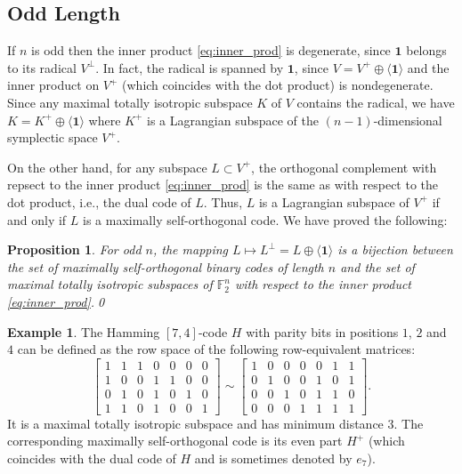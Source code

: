 \documentclass[a4paper,reqno]{amsart}
\newcommand{\buno}{\mathbf{1}}
\newcommand{\bzero}{\mathbf{0}}
\newcommand{\FF}{\mathbb{F}}
\newtheorem{proposition}[theorem]{Proposition}
\theoremstyle{definition}
\newtheorem{example}[theorem]{Example}
\theoremstyle{remark} \newtheorem{remark}[theorem]{Remark}
\numberwithin{equation}{section}
\begin{document}
\subsection{Odd Length}

If $n$ is odd then the inner product \eqref{eq:inner_prod} is degenerate, since $\buno$ belongs to its radical $V^\perp$. In fact, the radical is spanned by $\buno$, since $V=V^+\oplus\langle\buno\rangle$ and the inner product on $V^+$ (which coincides with the dot product) is nondegenerate. Since any maximal totally isotropic subspace $K$ of $V$ contains the radical, we have $K=K^+\oplus\langle\buno\rangle$ where $K^+$ is a Lagrangian subspace of the $(n-1)$-dimensional symplectic space $V^+$. 

On the other hand, for any subspace $L\subset V^+$, the orthogonal complement with repsect to the inner product \eqref{eq:inner_prod} is the same as with respect to the dot product, i.e., the dual code of $L$. Thus, $L$ is a Lagrangian subspace of $V^+$ if and only if $L$ is a maximally self-orthogonal code. We have proved the following:

\begin{proposition}\label{prop:odd_n}
    For odd $n$, the mapping $L\mapsto L^\perp=L\oplus\langle\buno\rangle$ is a bijection between the set of maximally self-orthogonal binary codes of length $n$ and the set of maximal totally isotropic subspaces of $\FF_2^n$ with respect to the inner product \eqref{eq:inner_prod}.\qed 
\end{proposition}

\begin{example}\label{ex:Hamming}
The Hamming $[7,4]$-code $H$ with parity bits in positions $1$, $2$ and $4$ can be defined as the row space of the following row-equivalent matrices:
\[
\begin{bmatrix}
1 & 1 & 1 & 0 & 0 & 0 & 0\\
1 & 0 & 0 & 1 & 1 & 0 & 0\\
0 & 1 & 0 & 1 & 0 & 1 & 0\\
1 & 1 & 0 & 1 & 0 & 0 & 1
\end{bmatrix}\sim
\begin{bmatrix}
1 & 0 & 0 & 0 & 0 & 1 & 1\\
0 & 1 & 0 & 0 & 1 & 0 & 1\\
0 & 0 & 1 & 0 & 1 & 1 & 0\\
0 & 0 & 0 & 1 & 1 & 1 & 1
\end{bmatrix}.
\]
It is a maximal totally isotropic subspace and has minimum distance $3$. 
The corresponding maximally self-orthogonal code is its even part $H^+$ (which coincides with the dual code of $H$ and is sometimes denoted by $e_7$).
\end{example}
\end{document}
